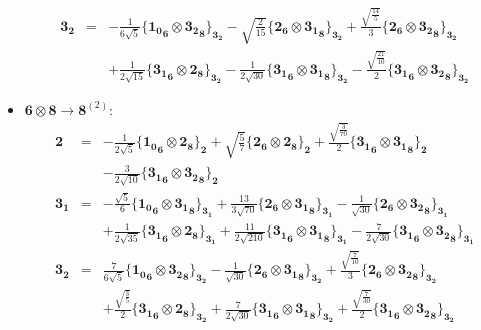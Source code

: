 \documentclass[english]{article}
\newcommand{\subcg}[3]{\big\{ {#1}\otimes{#2}\big\}^{}_{#3}}
\newcommand{\rep}[1]{\mathbf{#1}}
\begin{document}
\begin{itemize}
\begin{eqnarray*}
\\
\rep{3_2} &=& -\frac{1}{6 \sqrt{5}}\subcg{\rep{1_0}_{\rep{6}}}{\rep{3_2}_{\rep{8}}}{\rep{3_2}}-\sqrt{\frac{2}{15}}\subcg{\rep{2}_{\rep{6}}}{\rep{3_1}_{\rep{8}}}{\rep{3_2}}+\frac{\sqrt{\frac{14}{5}}}{3}\subcg{\rep{2}_{\rep{6}}}{\rep{3_2}_{\rep{8}}}{\rep{3_2}} \\ 
 & & +\frac{1}{2 \sqrt{15}}\subcg{\rep{3_1}_{\rep{6}}}{\rep{2}_{\rep{8}}}{\rep{3_2}}-\frac{1}{2 \sqrt{30}}\subcg{\rep{3_1}_{\rep{6}}}{\rep{3_1}_{\rep{8}}}{\rep{3_2}}-\frac{\sqrt{\frac{21}{10}}}{2}\subcg{\rep{3_1}_{\rep{6}}}{\rep{3_2}_{\rep{8}}}{\rep{3_2}}
\end{eqnarray*}
\item $\rep{6}\otimes\rep{8}\to\rep{8}^{(2)}$:
\begin{eqnarray*}
\rep{2} &=& -\frac{1}{2 \sqrt{5}}\subcg{\rep{1_0}_{\rep{6}}}{\rep{2}_{\rep{8}}}{\rep{2}}+\sqrt{\frac{5}{7}}\subcg{\rep{2}_{\rep{6}}}{\rep{2}_{\rep{8}}}{\rep{2}}+\frac{\sqrt{\frac{3}{70}}}{2}\subcg{\rep{3_1}_{\rep{6}}}{\rep{3_1}_{\rep{8}}}{\rep{2}} \\ 
 & & -\frac{3}{2 \sqrt{10}}\subcg{\rep{3_1}_{\rep{6}}}{\rep{3_2}_{\rep{8}}}{\rep{2}}
\\
\rep{3_1} &=& -\frac{\sqrt{5}}{6}\subcg{\rep{1_0}_{\rep{6}}}{\rep{3_1}_{\rep{8}}}{\rep{3_1}}+\frac{13}{3 \sqrt{70}}\subcg{\rep{2}_{\rep{6}}}{\rep{3_1}_{\rep{8}}}{\rep{3_1}}-\frac{1}{\sqrt{30}}\subcg{\rep{2}_{\rep{6}}}{\rep{3_2}_{\rep{8}}}{\rep{3_1}} \\ 
 & & +\frac{1}{2 \sqrt{35}}\subcg{\rep{3_1}_{\rep{6}}}{\rep{2}_{\rep{8}}}{\rep{3_1}}+\frac{11}{2 \sqrt{210}}\subcg{\rep{3_1}_{\rep{6}}}{\rep{3_1}_{\rep{8}}}{\rep{3_1}}-\frac{7}{2 \sqrt{30}}\subcg{\rep{3_1}_{\rep{6}}}{\rep{3_2}_{\rep{8}}}{\rep{3_1}}
\\
\rep{3_2} &=& \frac{7}{6 \sqrt{5}}\subcg{\rep{1_0}_{\rep{6}}}{\rep{3_2}_{\rep{8}}}{\rep{3_2}}-\frac{1}{\sqrt{30}}\subcg{\rep{2}_{\rep{6}}}{\rep{3_1}_{\rep{8}}}{\rep{3_2}}+\frac{\sqrt{\frac{7}{10}}}{3}\subcg{\rep{2}_{\rep{6}}}{\rep{3_2}_{\rep{8}}}{\rep{3_2}} \\ 
 & & +\frac{\sqrt{\frac{3}{5}}}{2}\subcg{\rep{3_1}_{\rep{6}}}{\rep{2}_{\rep{8}}}{\rep{3_2}}+\frac{7}{2 \sqrt{30}}\subcg{\rep{3_1}_{\rep{6}}}{\rep{3_1}_{\rep{8}}}{\rep{3_2}}+\frac{\sqrt{\frac{7}{30}}}{2}\subcg{\rep{3_1}_{\rep{6}}}{\rep{3_2}_{\rep{8}}}{\rep{3_2}}
\end{eqnarray*}
\end{itemize}
\end{document}
